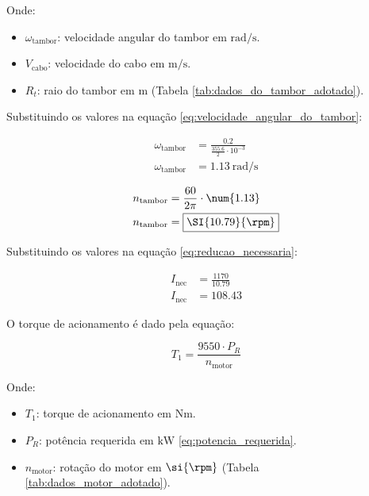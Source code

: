 Onde:

\begin{itemize}[leftmargin=1.25cm]
  \item $\omega_{\text{tambor}}$: velocidade angular do tambor em $\si{\radian\per\second}$.
  \item $V_{\text{cabo}}$: velocidade do cabo em $\si{\meter\per\second}$.
  \item $R_t$: raio do tambor em $\si{\meter}$ (Tabela \ref{tab:dados_do_tambor_adotado}).
\end{itemize}

\vspace{1em}

Substituindo os valores na equação \eqref{eq:velocidade_angular_do_tambor}:

\begin{align*}
  \omega_{\text{tambor}} & = \frac{\num{0.2}}{\frac{\num{355.6}}{2} \cdot 10^{-3}} \\
  \omega_{\text{tambor}} & = \boxed{\SI{1.13}{\radian\per\second}}
\end{align*}

\begin{align*}
  n_{\text{tambor}} & = \frac{60}{2 \pi} \cdot \num{1.13} \\
  n_{\text{tambor}} & = \boxed{\SI{10.79}{\rpm}}
\end{align*}

Substituindo os valores na equação \eqref{eq:reducao_necessaria}:

\begin{align*}
  I_{\text{nec}} & = \frac{1170}{\num{10.79}} \\
  I_{\text{nec}} & = \boxed{\num{108.43}}
\end{align*}

O torque de acionamento é dado pela equação:

\begin{equation}
  T_1 = \frac{9550 \cdot P_R}{n_{\text{motor}}}
  \label{eq:torque_acionamento}
\end{equation}

Onde:

\begin{itemize}[leftmargin=1.25cm]
  \item $T_1$: torque de acionamento em $\si{\newton\meter}$.
  \item $P_R$: potência requerida em $\si{\kilo\watt}$ \eqref{eq:potencia_requerida}.
  \item $n_{\text{motor}}$: rotação do motor em $\si{\rpm}$ (Tabela \ref{tab:dados_motor_adotado}).
\end{itemize}

